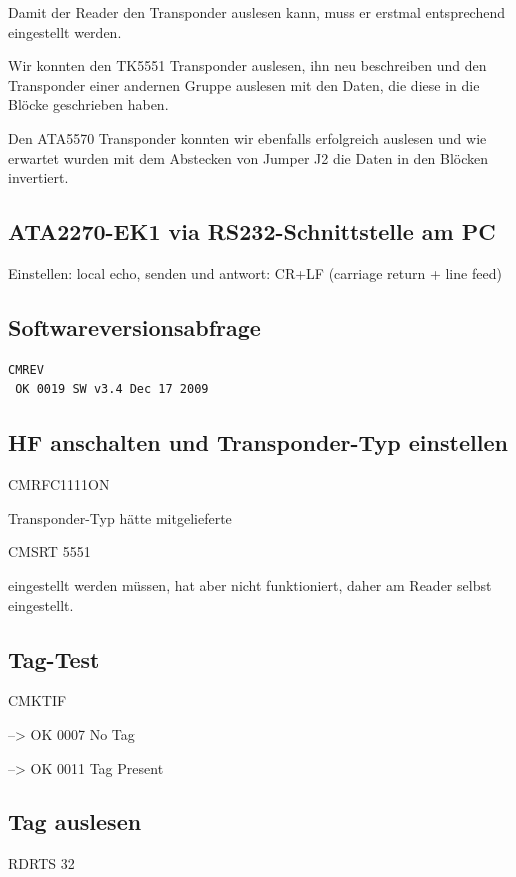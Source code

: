 \documentclass[paper=a4,fontsize=11pt,headsepline,footsepline,parskip=half]{scrartcl}
\begin{document}
Damit der Reader den Transponder auslesen kann, muss er erstmal entsprechend eingestellt werden.

Wir konnten den TK5551 Transponder auslesen, ihn neu beschreiben und den Transponder einer andernen Gruppe auslesen mit den Daten, die
diese in die Blöcke geschrieben haben.

Den ATA5570 Transponder konnten wir ebenfalls erfolgreich auslesen und wie erwartet wurden mit dem Abstecken von Jumper J2 die Daten
in den Blöcken invertiert.

\subsection{ATA2270-EK1 via RS232-Schnittstelle am PC}

Einstellen: local echo, senden und antwort: CR+LF (carriage return + line feed)

\subsection{Softwareversionsabfrage}

\begin{lstlisting}[caption={Softwareversionsabfrage}]
 CMREV
 OK 0019 SW v3.4 Dec 17 2009
\end{lstlisting}

\subsection{HF anschalten und Transponder-Typ einstellen}

CMRFC1111ON

Transponder-Typ hätte mitgelieferte

CMSRT 5551

eingestellt werden müssen, hat aber nicht funktioniert, daher am Reader selbst eingestellt.

\subsection{Tag-Test}

CMKTIF

--> OK 0007 No Tag

--> OK 0011 Tag Present

\subsection{Tag auslesen}

RDRTS 32
\end{document}
